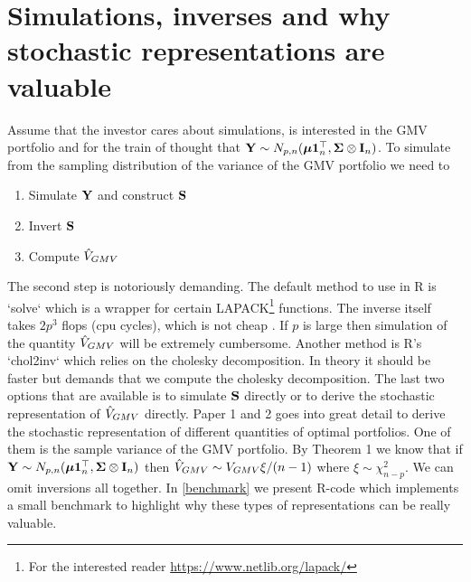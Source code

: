 \documentclass[oneside]{book}\usepackage{knitr}
\begin{document}
\section{Simulations, inverses and why stochastic representations are valuable}
Assume that the investor cares about simulations, is interested in the GMV portfolio and for the train of thought that $\mathbf{Y} \sim N_{p,n}(\mbox{\boldmath$\mu$} \mathbf{1}_n^\top, \mathbf{\Sigma} \otimes \mathbf{I}_n)$. To simulate from the sampling distribution of the variance of the GMV portfolio we need to 
\begin{enumerate}
  \item Simulate $\mathbf{Y}$ and construct $\mathbf{S}$
  \item Invert $\mathbf{S}$
  \item Compute $\hat{V}_{GMV}$
\end{enumerate}
The second step is notoriously demanding.
The default method to use in R is `solve` which is a wrapper for certain LAPACK\footnote{For the interested reader \url{https://www.netlib.org/lapack/}} functions.
The inverse itself takes $2p^3$ flops (cpu cycles), which is not cheap \citet[ch 14]{higham2002accuracy}.
If $p$ is large then simulation of the quantity $\hat{V}_{GMV}$ will be extremely cumbersome.
Another method is R's `chol2inv` which relies on the cholesky decomposition. 
In theory it should be faster but demands that we compute the cholesky decomposition.
The last two options that are available is to simulate $\mathbf{S}$ directly or to derive the stochastic representation of $\hat{V}_{GMV}$ directly.
Paper 1 and 2 goes into great detail to derive the stochastic representation of different quantities of optimal portfolios. 
One of them is the sample variance of the GMV portfolio.
By Theorem 1 \citet{bodnar2020sampling} we know that if $\mathbf{Y} \sim N_{p,n}(\mbox{\boldmath$\mu$} \mathbf{1}_n^\top, \mathbf{\Sigma} \otimes \mathbf{I}_n)$ then $\hat{V}_{GMV} \sim V_{GMV}\xi /(n-1)$ where $\xi \sim \chi^2_{n-p}$.
We can omit inversions all together.
In \ref{benchmark} we present R-code which implements a small benchmark to highlight why these types of representations can be really valuable.
\end{document}
